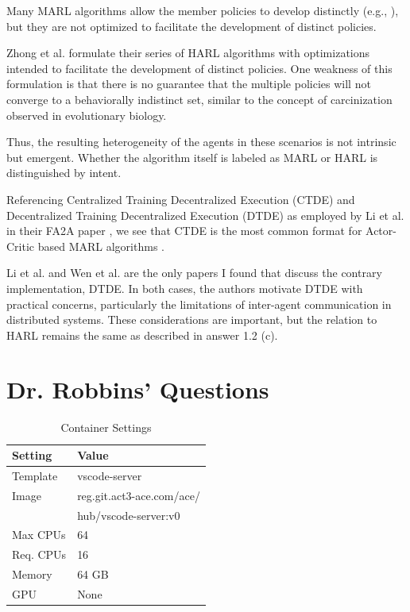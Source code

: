 \documentclass[12pt,letterpaper]{exam}
\begin{document}
\begin{questions}
\begin{parts}
		Many MARL algorithms allow the member policies to develop distinctly 
		(e.g., \cite{foerster2017, rashid2018, lowe2020}), but they are 
		not optimized to facilitate the development of distinct policies.

		Zhong et al. \cite{zhong2024} formulate their series of HARL 
		algorithms with optimizations intended to facilitate the development 
		of distinct policies. One weakness of this formulation is that there 
		is no guarantee that the multiple policies will not converge to a 
		behaviorally indistinct set, similar to the concept of 
		carcinization observed in evolutionary biology.

		Thus, the resulting heterogeneity of the agents in these scenarios 
		is not intrinsic but emergent. Whether the algorithm itself is 
		labeled as MARL or HARL is distinguished by intent.
	\end{parts}

	\question
	Referencing Centralized Training Decentralized Execution (CTDE) 
	and Decentralized Training Decentralized Execution (DTDE) as employed 
	by Li et al. in their FA2A paper \cite{li2023d}, we see that CTDE is 
	the most common format for Actor-Critic based MARL algorithms 
	\cite{foerster2017, rashid2018, lowe2020, li2023d, zhou2023}.

	Li et al. \cite{li2023d} and Wen et al. \cite{wen2021} are the only 
	papers I found that discuss the contrary implementation, DTDE. 
	In both cases, the authors motivate DTDE with practical concerns, 
	particularly the limitations of inter-agent communication in 
	distributed systems. These considerations are important, but the 
	relation to HARL remains the same as described in answer 1.2 (c).
\end{questions}


\section{Dr. Robbins' Questions}

\begin{table}
	\centering
	\vspace*{-1em}
	\begin{tabular}{ll}
		Setting & Value \\
		\midrule
		Template & vscode-server \\
		Image & reg.git.act3-ace.com/ace/ \\
			& hub/vscode-server:v0 \\
		Max CPUs & 64\\
		Req. CPUs & 16 \\
		Memory & 64 GB \\
		GPU & None \\
		\bottomrule
	\end{tabular}
	\caption{Container Settings}
	\label{tab:vm_specs}
	\vspace*{-1em}
\end{table}
\end{document}
